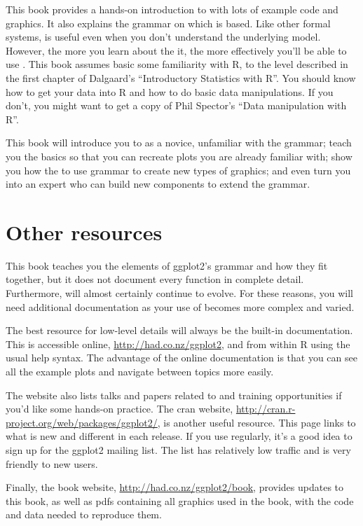 This book provides a hands-on introduction to \ggplot with lots of example code and graphics. It also explains the grammar on which \ggplot is based. Like other formal systems, \ggplot is useful even when you don't understand the underlying model. However, the more you learn about the it, the more effectively you'll be able to use \ggplot.  This book assumes basic some familiarity with R, to the level described in the first chapter of Dalgaard’s ``Introductory Statistics with R''. You should know how to get your data into R and how to do basic data manipulations.  If you don't, you might want to get a copy of Phil Spector's ``Data manipulation with R''.  

This book will introduce you to \ggplot as a novice, unfamiliar with the grammar; teach you the basics so that you can recreate plots you are already familiar with; show you how the to use grammar to create new types of graphics; and even turn you into an expert who can build new components to extend the grammar.

\section{Other resources}
\label{sec:other_resources}

This book teaches you the elements of ggplot2's grammar and how they fit together, but it does not document every function in complete detail.  Furthermore, \ggplot will almost certainly continue to evolve.  For these reasons, you will need additional documentation as your use of \ggplot becomes more complex and varied.

The best resource for low-level details will always be the built-in documentation. This is accessible online, \url{http://had.co.nz/ggplot2}, and from within R using the usual help syntax. The advantage of the online documentation is that you can see all the example plots and navigate between topics more easily. 

The website also lists talks and papers related to \ggplot and training opportunities if you'd like some hands-on practice. The {\sc cran} website, \url{http://cran.r-project.org/web/packages/ggplot2/}, is another useful resource. This page links to what is new and different in each release.  If you use \ggplot regularly, it's a good idea to sign up for the ggplot2 mailing list.  The list has relatively low traffic and is very friendly to new users.

Finally, the book website, \url{http://had.co.nz/ggplot2/book}, provides updates to this book, as well as pdfs containing all graphics used in the book, with the code and data needed to reproduce them.  

